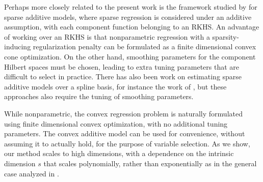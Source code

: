 Perhaps more closely related to the present work is the framework
studied by \citet{Raskutti:12} for sparse additive models, where sparse
regression is considered under an additive assumption, with each
component function belonging to an RKHS.  An advantage of working over
an RKHS is that nonparametric regression with a sparsity-inducing
regularization penalty can be formulated as a finite dimensional
convex cone optimization.  On the other hand, smoothing parameters for
the component Hilbert spaces must be chosen, leading to extra tuning
parameters that are difficult to select in practice. There has also been
work on estimating sparse additive models over a spline basis, for 
instance the work of \cite{huang2010variable}, but these approaches also
require the tuning of smoothing parameters. 

While nonparametric, the convex regression problem is naturally
formulated using finite dimensional convex optimization, with no
additional tuning parameters. The convex additive model can be used
for convenience, without assuming it to actually hold, for the purpose
of variable selection. As we show, our method scales to high
dimensions, with a dependence on the intrinsic dimension $s$ that
scales polynomially, rather than exponentially as in the general case
analyzed in \cite{dalalyan:12}. 



%
%
%
%
%
%
%
%


